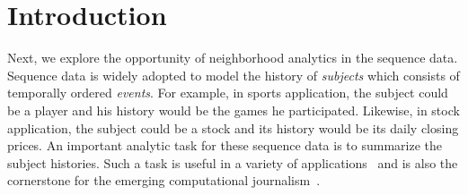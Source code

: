 \section{Introduction}
Next, we explore the opportunity of neighborhood analytics in the sequence data.
Sequence data is widely adopted to model the history
of \emph{subjects} which consists of temporally ordered \emph{events}.
For example, in sports application, the subject could be a player and his history would be the games he participated. Likewise, in stock application, the subject could be a stock and its history would be its daily closing prices.
%
An important analytic task for these sequence data
is to summarize the subject histories.
Such a task is useful in a variety
of applications~\cite{walenz2014finding,hassan2014data,sultana2014incremental, wu2012one} and is also the cornerstone for the emerging computational journalism~\cite{cohen2011computational}.


